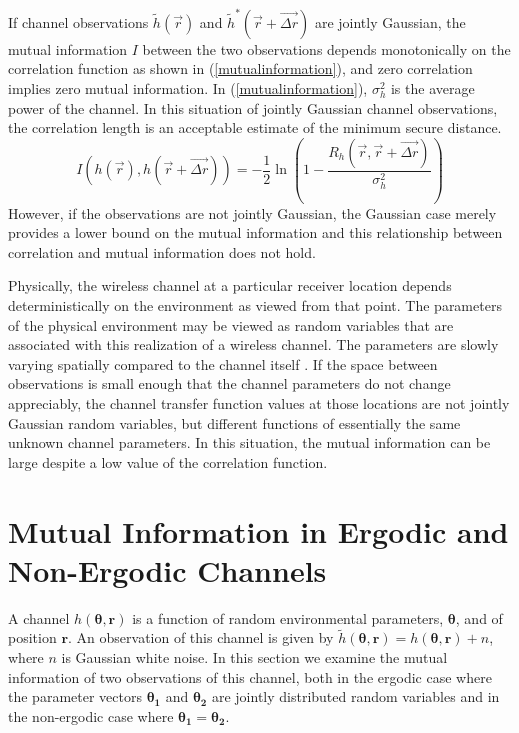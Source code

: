 \documentclass[conference]{ieeetran}
\begin{document}
If channel observations $\tilde{h}(\vec{r})$ and $\tilde{h}^*(\vec{r}+\vec{\Delta r})$ are jointly Gaussian, the mutual information $I$ between the two observations depends monotonically on the correlation function as shown in (\ref{mutualinformation}), and zero correlation implies zero mutual information.  In   (\ref{mutualinformation}), $\sigma_h^2$ is the average power of the channel.  In this situation of jointly Gaussian channel observations, the correlation length is an acceptable estimate of the minimum secure distance.
\begin{equation}\label{mutualinformation}
I(h(\vec{r}),h(\vec{r}+\vec{\Delta r})) = -\frac{1}{2}\ln\left(1-\frac{R_h(\vec{r},\vec{r}+\vec{\Delta r})}{\sigma_h^2}\right)
\end{equation}
However, if the observations are not jointly Gaussian, the Gaussian case merely provides a lower bound on the mutual information and this relationship between correlation and mutual information does not hold. %

Physically, the wireless channel  at a particular receiver location depends deterministically on the environment as viewed from that point.  The parameters of the physical environment may be viewed as random variables that are associated with this realization of a wireless channel.  The parameters are slowly varying spatially compared to the channel   itself \cite{jakes1974, duel-hallen2007}.  If the space between observations is small enough that the channel parameters do not change appreciably, the channel transfer function values at those locations are not jointly Gaussian random variables, but different functions of essentially the same unknown channel parameters.  In this situation, the mutual information can be large despite a low value of the correlation function.

\section{Mutual Information in Ergodic and Non-Ergodic Channels}
A channel $h(\boldsymbol{\theta},\mathbf{r})$ is a function of random environmental parameters, $\boldsymbol{\theta}$, and of position $\mathbf{r}$.  An observation of this channel is given by $\tilde{h}(\boldsymbol{\theta},\mathbf{r})=h(\boldsymbol{\theta},\mathbf{r})+n$, where $n$ is Gaussian white noise.  In this section we examine the mutual information of two observations of this channel, both in the ergodic case where the parameter vectors $\boldsymbol{\theta_1}$ and $\boldsymbol{\theta_2}$ are jointly distributed random variables and in the non-ergodic case where $\boldsymbol{\theta_1}=\boldsymbol{\theta_2}$.  
\end{document}

